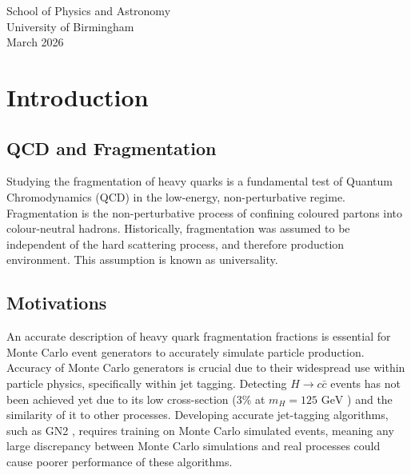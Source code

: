 \documentclass[12pt]{article}
\begin{document}
\begin{titlepage}
\begin{center}
        \Large
        School of Physics and Astronomy\\
        University of Birmingham\\
        March 2026\\
    \end{center}
\end{titlepage}


\pagebreak
\tableofcontents
\pagebreak




\newpage
\section{Introduction}
\label{sec:introduction}

\subsection{QCD and Fragmentation}
Studying the fragmentation of heavy quarks is a fundamental test of Quantum Chromodynamics (QCD) in the low-energy, non-perturbative regime. Fragmentation is the non-perturbative process of confining coloured partons into colour-neutral hadrons. Historically, fragmentation was assumed to be independent of the hard scattering process, and therefore production environment. This assumption is known as universality.

\subsection{Motivations}
An accurate description of heavy quark fragmentation fractions is essential for Monte Carlo event generators to accurately simulate particle production. Accuracy of Monte Carlo generators is crucial due to their widespread use within particle physics, specifically within jet tagging. Detecting $H \rightarrow c\bar{c}$ events has not been achieved yet due to its low cross-section (3\% at $m_H = 125 \text{ GeV}$ \cite{higgs}) and the similarity of it to other processes. Developing accurate jet-tagging algorithms, such as GN2 \cite{gn2}, requires training on Monte Carlo simulated events, meaning any large discrepancy between Monte Carlo simulations and real processes could cause poorer performance of these algorithms.
\end{document}
